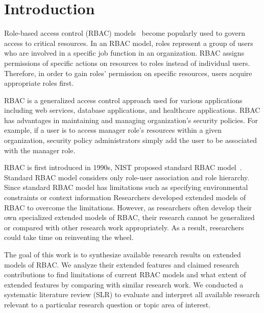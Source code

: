 \section{Introduction} \label{sec:introduction}

Role-based access control (RBAC) models~\cite{ferraiolo:rbac} become popularly used
to govern access to critical resources.
In an RBAC model, roles represent a group of users who are
involved in a specific job function in an organization. 
RBAC assigns permissions of specific actions on resources to roles
instead of individual users.
Therefore, in order to gain roles' permission on specific resources, users acquire appropriate roles first.

RBAC is a generalized access control approach used for various applications including
web services, database applications, and healthcare applications.
RBAC has advantages in maintaining and managing organization's security policies.
For example, if a user is to access manager role's resources within a given
organization, security policy administrators simply add the user to be associated with the manager role.

RBAC is first introduced in 1990s, NIST proposed standard RBAC model~\cite{ferraiolo:rbac}.
Standard RBAC model considers only role-user association and role hierarchy.
Since standard RBAC model has limitations such as specifying environmental constraints or context information 
Researchers developed extended models of RBAC to overcome the limitations.
However, as researchers often develop their own specialized extended models of RBAC,
their research cannot be generalized or compared with other research work appropriately.
As a result, researchers could take time on reinventing the wheel.    

The goal of this work is to synthesize available research results on extended models of RBAC. We analyze their extended features and claimed research contributions to find limitations of current RBAC models and what extent of extended features by
comparing with similar research work. 
We conducted a systematic literature review (SLR) to evaluate and interpret all available research relevant to a particular research question or topic area of interest.

